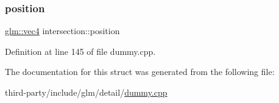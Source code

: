 \subsubsection{\texorpdfstring{position}{position}}
{\footnotesize\ttfamily \hyperlink{group__core__types_ga5881b1b022d7fd1b7218f5916532dd02}{glm\+::vec4} intersection\+::position}



Definition at line 145 of file dummy.\+cpp.



The documentation for this struct was generated from the following file\+:\begin{DoxyCompactItemize}
\item 
third-\/party/include/glm/detail/\hyperlink{dummy_8cpp}{dummy.\+cpp}\end{DoxyCompactItemize}
